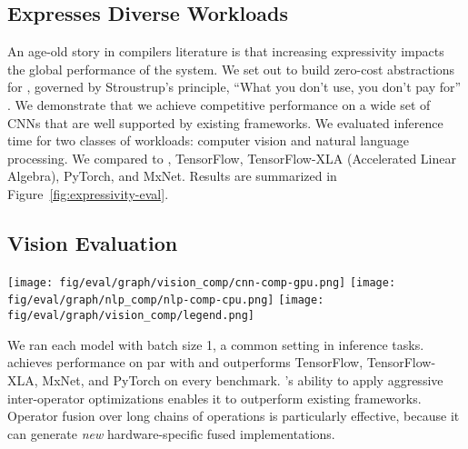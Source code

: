 \subsection{\relay Expresses Diverse Workloads}
\label{sec:perf-gpu}

An age-old story in compilers literature is that increasing expressivity
  impacts the global performance of the system.
We set out to build zero-cost abstractions for \relay,
  governed by Stroustrup's principle, ``What you don't use, you don't pay
  for'' \cite{bjarne}.
We demonstrate that we achieve competitive performance on a wide set of CNNs that are well supported by existing frameworks.
We evaluated inference time for two classes of workloads: computer vision and natural language processing.
We compared \relay to \nnvm,
  TensorFlow, TensorFlow-XLA (Accelerated Linear Algebra), PyTorch, and MxNet.
Results are summarized in Figure~\ref{fig:expressivity-eval}.

\subsection*{Vision Evaluation}

\begin{figure*}[htbp!]
  \centering
  \texttt{[image: fig/eval/graph/vision\_comp/cnn-comp-gpu.png]}
  \texttt{[image: fig/eval/graph/nlp\_comp/nlp-comp-cpu.png]}
  \texttt{[image: fig/eval/graph/vision\_comp/legend.png]}
  \caption{\textmd{
    Inference speedup of \relay relative to popular frameworks
      on vision and NLP benchmarks.
    The vision benchmarks used an NVIDIA Titan-V GPU, and the NLP benchmarks ran on CPU only.
    We ran 1000 trials for each model, except for CharRNN, on which we used 100 trials.
    \relay matches the performance of NNVM on vision but additionally supports NLP,
      where \relay provides performance competitive to the state of the art (up to
        2.3$\times$ speedup over MxNet on GRU).
  }}
  \label{fig:expressivity-eval}
\end{figure*}

We ran each model with
  batch size 1, a common setting in inference tasks.
\relay achieves performance on par with \nnvm
  and outperforms TensorFlow, TensorFlow-XLA, MxNet, and
  PyTorch on every benchmark.
\relay's ability to apply aggressive inter-operator optimizations
  enables it to outperform existing frameworks.
Operator fusion over long chains of operations is particularly effective,
  because it can generate \textit{new} hardware-specific fused implementations.

